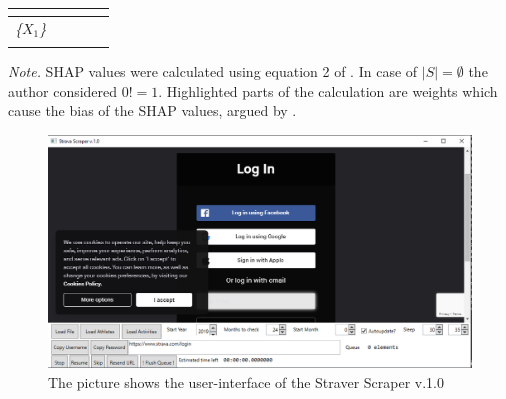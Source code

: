 \documentclass[12pt,a4paper]{article}
\begin{document}
\begin{table}[!htbp]
\begin{threeparttable}
\begin{tabular}{*{5}{l}}
         &
         & 
          &
\\
        \midrule
        \textit{\{$X_1$\}}   &
          &
         & 
          &
\\
\midrule
\midrule
&&&   &
 \\
\bottomrule
     \end{tabular}
    \begin{tablenotes}[flushleft]
      \small
      \item \textit{Note.} SHAP values were calculated using equation 2 of \textcite{Lundberg2017}. In case of $|S|=\emptyset$ the author considered $0! = 1$. Highlighted parts of the calculation are weights which cause the bias of the SHAP values, argued by \textcite{Amoukou2021}. 
    \end{tablenotes}
    \label{tab:SHAP_bias}
  \end{threeparttable}
\end{table}

\begin{figure}
\includegraphics[trim=0in 0.01in 0.08in 0.05in,clip]{./includes/Strava_scraper.png}
\caption{The picture shows the user-interface of the Straver Scraper v.1.0}
\label{fig:scraper_pic}
\end{figure}
\clearpage


\end{document}
